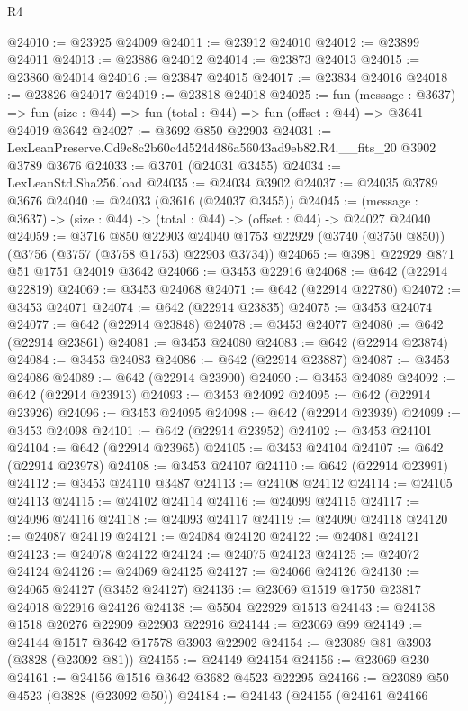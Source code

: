 \begin{lexlean}{R4}
\begin{coremodule}
@24010 := @23925 @24009
@24011 := @23912 @24010
@24012 := @23899 @24011
@24013 := @23886 @24012
@24014 := @23873 @24013
@24015 := @23860 @24014
@24016 := @23847 @24015
@24017 := @23834 @24016
@24018 := @23826 @24017
@24019 := @23818 @24018
@24025 := fun (message : @3637) =>
  fun (size : @44) => fun (total : @44) => fun (offset : @44) => @3641 @24019 @3642
@24027 := @3692 @850 @22903
@24031 := LexLeanPreserve.Cd9c8c2b60c4d524d486a56043ad9eb82.R4.__fits_20 @3902 @3789 @3676
@24033 := @3701 (@24031 @3455)
@24034 := LexLeanStd.Sha256.load
@24035 := @24034 @3902
@24037 := @24035 @3789 @3676
@24040 := @24033 (@3616 (@24037 @3455))
@24045 := (message : @3637) -> (size : @44) -> (total : @44) -> (offset : @44) -> @24027 @24040
@24059 := @3716
    @850
    @22903
    @24040
    @1753
    @22929
    (@3740 (@3750 @850))
    (@3756 (@3757 (@3758 @1753) @22903 @3734))
@24065 := @3981 @22929 @871 @51 @1751 @24019 @3642
@24066 := @3453 @22916
@24068 := @642 (@22914 @22819)
@24069 := @3453 @24068
@24071 := @642 (@22914 @22780)
@24072 := @3453 @24071
@24074 := @642 (@22914 @23835)
@24075 := @3453 @24074
@24077 := @642 (@22914 @23848)
@24078 := @3453 @24077
@24080 := @642 (@22914 @23861)
@24081 := @3453 @24080
@24083 := @642 (@22914 @23874)
@24084 := @3453 @24083
@24086 := @642 (@22914 @23887)
@24087 := @3453 @24086
@24089 := @642 (@22914 @23900)
@24090 := @3453 @24089
@24092 := @642 (@22914 @23913)
@24093 := @3453 @24092
@24095 := @642 (@22914 @23926)
@24096 := @3453 @24095
@24098 := @642 (@22914 @23939)
@24099 := @3453 @24098
@24101 := @642 (@22914 @23952)
@24102 := @3453 @24101
@24104 := @642 (@22914 @23965)
@24105 := @3453 @24104
@24107 := @642 (@22914 @23978)
@24108 := @3453 @24107
@24110 := @642 (@22914 @23991)
@24112 := @3453 @24110 @3487
@24113 := @24108 @24112
@24114 := @24105 @24113
@24115 := @24102 @24114
@24116 := @24099 @24115
@24117 := @24096 @24116
@24118 := @24093 @24117
@24119 := @24090 @24118
@24120 := @24087 @24119
@24121 := @24084 @24120
@24122 := @24081 @24121
@24123 := @24078 @24122
@24124 := @24075 @24123
@24125 := @24072 @24124
@24126 := @24069 @24125
@24127 := @24066 @24126
@24130 := @24065 @24127 (@3452 @24127)
@24136 := @23069 @1519 @1750 @23817 @24018 @22916 @24126
@24138 := @5504 @22929 @1513
@24143 := @24138 @1518 @20276 @22909 @22903 @22916
@24144 := @23069 @99
@24149 := @24144 @1517 @3642 @17578 @3903 @22902
@24154 := @23089 @81 @3903 (@3828 (@23092 @81))
@24155 := @24149 @24154
@24156 := @23069 @230
@24161 := @24156 @1516 @3642 @3682 @4523 @22295
@24166 := @23089 @50 @4523 (@3828 (@23092 @50))
@24184 := @24143
    (@24155
      (@24161
        @24166

\end{coremodule}
\end{lexlean}

